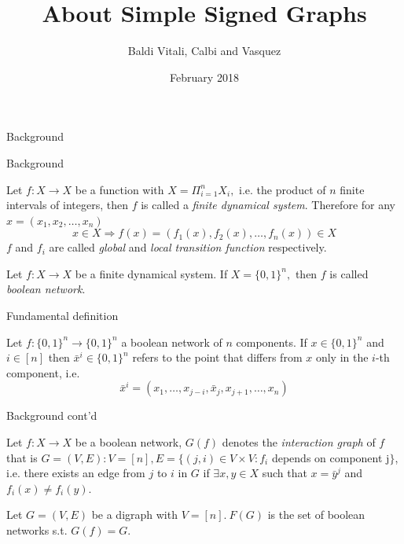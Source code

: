 \documentclass{beamer}
\title{About Simple Signed Graphs}
\author{Baldi Vitali, Calbi and Vasquez}
\institute{Université Nice Sophia-Antipolis}
\date{February 2018}
\begin{document}
	
\frame{\titlepage}

\begin{section}{Background}

\begin{frame}{Background}
    \begin{definition}
        Let $f:X \to X$ be a function with $X=\Pi_{i=1}^n X_i,$ i.e. the product of $n$ finite intervals of integers, then $f$ is called a \textit{finite dynamical system}. Therefore for any $x = (x_1, x_2, \dots, x_n)$
        \[
        x \in X \Rightarrow f(x) = (f_1(x), f_2(x), \dots, f_n(x)) \in X
        \]
        $f$ and $f_i$ are called \textit{global} and \textit{local transition function} respectively.
    \end{definition}
    
    \begin{definition}
        Let $f:X \to X$ be a finite dynamical system. If $X=\{0,1\}^n,$ then $f$ is called \textit{boolean network}.
    \end{definition}
\end{frame}

\begin{frame}{Fundamental definition}
    \begin{definition}[$\bar{x}^i$]
    	Let $f:\{0,1\}^n \rightarrow \{0,1\}^n$ a boolean network of $n$ components. If $x \in \{0,1\}^n$ and $i \in [n]$ then $\bar{x}^i \in \{0,1\}^n$ refers to the point that differs from $x$ only in the $i$-th component, i.e.
    	\[
    	\bar{x}^i = (x_1, \dots, x_{j-i}, \bar{x}_j, x_{j+1}, \dots, x_n)
    	\]
    \end{definition}
\end{frame}

\begin{frame}{Background cont'd}
    \begin{definition}
        Let $f : X \to X$ be a boolean network, $G(f)$ denotes the \textit{interaction graph} of $f$ that is $G=(V,E) : V = [n], E = \{ (j,i) \in V \times V : f_i$ depends on component j$\}$, i.e. there exists an edge from $j$ to $i$ in $G$ if $\exists x,y \in X$ such that $x = \bar{y}^j$ and $f_i(x) \neq f_i(y)$.
    \end{definition}
    \begin{definition}[F(G)]
        Let $G=(V,E)$ be a digraph with $V=[n].\ F(G)$ is the set of boolean networks s.t. $G(f)=G.$
    \end{definition}
\end{frame}
\begin{frame}
    

\end{frame}
\end{section}
\end{document}
